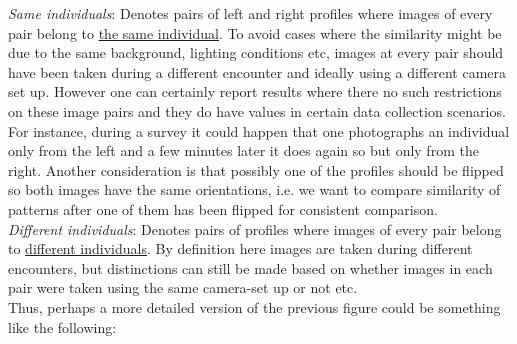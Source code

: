 \documentclass[11pt, twoside]{article}
\begin{document}
\noindent
\emph{Same individuals}: Denotes pairs of left and right profiles where images of every pair belong to \underline{the same individual}. To avoid cases where the similarity might be due to the same background, lighting conditions etc,  images at every pair should have been taken during a different encounter and ideally using a different camera set up. However one can certainly report results where there no such restrictions on these image pairs and they do have values in certain data collection scenarios.  For instance, during a survey it could happen that one photographs an individual only from the left and a few minutes later it does again so but only from the right.
Another consideration is that  possibly one of the profiles should be flipped so both images have the same orientations, i.e. we want to compare similarity of patterns after one of them has been flipped for consistent comparison. \\
\emph{Different individuals}: Denotes pairs of profiles where images of every pair belong to \underline{different individuals}. By definition here images are taken during different encounters, but distinctions can still be made based on whether images in each pair were taken using the same camera-set up or not etc.\\

\noindent
Thus, perhaps a more detailed version of the previous figure could be something like the following:
\end{document}
